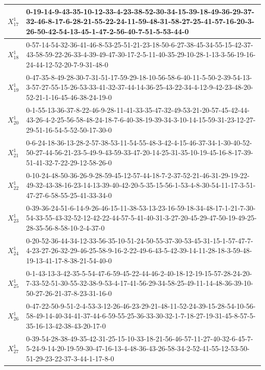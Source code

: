 \begin{landscape}
{\begin{tabularx}{\linewidth}{|c|X|}
        $X_{17}^{1}$ & 0-19-14-9-43-35-10-12-33-4-23-38-52-30-34-15-39-18-49-36-29-37-32-46-8-17-6-28-21-55-22-24-11-59-48-31-58-27-25-41-57-16-20-3-26-50-42-54-13-45-1-47-2-56-40-7-51-5-53-44-0 \\ \hline
        $X_{18}^{1}$ & 0-57-14-54-32-36-41-46-8-53-25-51-21-23-18-50-6-27-38-45-34-55-15-42-37-43-58-59-22-26-33-4-39-49-47-30-17-2-5-11-40-35-29-10-28-1-13-3-56-19-16-24-44-12-52-20-7-9-31-48-0 \\ \hline
        $X_{19}^{1}$ & 0-47-35-8-49-28-30-7-31-51-17-59-29-18-10-56-58-6-40-11-5-50-2-39-54-13-3-57-27-55-15-26-53-33-41-32-37-44-14-36-25-43-22-34-4-12-9-42-23-48-20-52-21-1-16-45-46-38-24-19-0 \\ \hline
        $X_{20}^{1}$ & 0-1-55-13-36-37-8-22-46-9-28-11-41-33-35-47-32-49-53-21-20-57-45-42-44-43-26-4-2-25-56-58-48-24-18-7-6-40-38-19-39-34-3-10-14-15-59-31-23-12-27-29-51-16-54-5-52-50-17-30-0 \\ \hline
        $X_{21}^{1}$ & 0-6-24-18-36-13-28-2-57-38-53-11-54-55-48-3-42-4-15-46-37-34-1-30-40-52-50-27-44-56-21-23-5-49-9-43-59-33-47-20-14-25-31-35-10-19-45-16-8-17-39-51-41-32-7-22-29-12-58-26-0 \\ \hline
        $X_{22}^{1}$ & 0-10-24-48-50-36-26-9-28-59-45-12-57-44-18-7-2-37-52-21-46-31-29-19-22-49-32-43-38-16-23-14-13-39-40-42-20-5-35-15-56-1-53-4-8-30-54-11-17-3-51-47-27-6-58-55-25-41-33-34-0 \\ \hline
        $X_{23}^{1}$ & 0-39-36-24-51-6-14-9-26-46-15-11-38-53-13-23-16-59-18-34-48-17-1-21-7-30-54-33-55-43-32-52-12-42-22-44-57-5-41-40-31-3-27-20-45-29-47-50-19-49-25-28-35-56-8-58-10-2-4-37-0 \\ \hline
        $X_{24}^{1}$ & 0-20-52-36-44-34-12-33-56-35-10-51-24-50-55-37-30-53-45-31-15-1-57-47-7-4-23-27-26-32-29-46-25-58-9-16-2-22-49-6-43-5-42-39-14-11-28-18-3-59-48-19-13-41-17-8-38-21-54-40-0 \\ \hline
        $X_{25}^{1}$ & 0-1-43-13-3-42-35-5-54-47-6-59-45-22-44-46-2-40-18-12-19-15-57-28-24-20-7-33-52-51-30-55-32-38-9-53-4-17-41-56-29-34-58-25-49-11-14-48-36-39-10-50-27-26-21-37-8-23-31-16-0 \\ \hline
        $X_{26}^{1}$ & 0-47-22-50-9-51-2-4-53-3-12-26-46-23-29-21-48-11-52-24-39-15-28-54-10-56-58-49-14-40-34-41-37-44-6-59-55-25-36-33-30-32-1-7-18-27-19-31-45-8-57-5-35-16-13-42-38-43-20-17-0 \\ \hline
        $X_{27}^{1}$ & 0-39-54-28-38-49-35-42-31-25-15-10-33-18-21-56-46-57-11-27-40-32-6-45-7-5-24-9-14-20-19-59-30-47-16-13-4-48-36-43-26-58-34-2-52-41-55-12-53-50-51-29-23-22-37-3-44-1-17-8-0 \\ \hline

\end{tabularx}}
\end{landscape}
